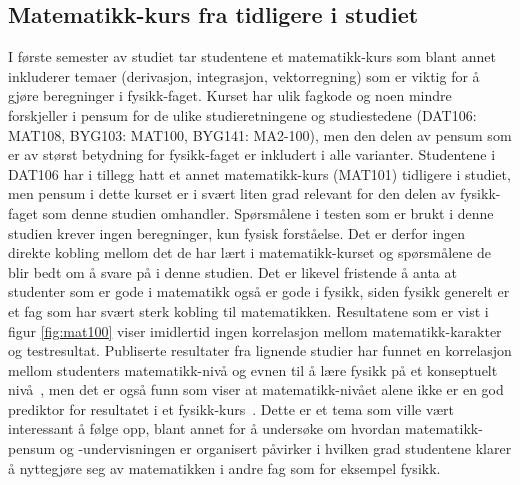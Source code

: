 \documentclass[a4paper,norsk,12pt]{report}
\begin{document}
\subsection{Matematikk-kurs fra tidligere i studiet}
I første semester av studiet tar studentene et matematikk-kurs som blant annet inkluderer temaer (derivasjon, integrasjon, vektorregning) som er viktig for å gjøre beregninger i fysikk-faget. Kurset har ulik fagkode og noen mindre forskjeller i pensum for de ulike studieretningene og studiestedene (DAT106: MAT108, BYG103: MAT100, BYG141: MA2-100), men den delen av pensum som er av størst betydning for fysikk-faget er inkludert i alle varianter. Studentene i DAT106 har i tillegg hatt et annet matematikk-kurs (MAT101) tidligere i studiet, men pensum i dette kurset er i svært liten grad relevant for den delen av fysikk-faget som denne studien omhandler. Spørsmålene i testen som er brukt i denne studien krever ingen beregninger, kun fysisk forståelse. Det er derfor ingen direkte kobling mellom det de har lært i matematikk-kurset og spørsmålene de blir bedt om å svare på i denne studien. Det er likevel fristende å anta at studenter som er gode i matematikk også er gode i fysikk, siden fysikk generelt er et fag som har svært sterk kobling til matematikken. Resultatene som er vist i figur \ref{fig:mat100} viser imidlertid ingen korrelasjon mellom matematikk-karakter og testresultat. Publiserte resultater fra lignende studier har funnet en korrelasjon mellom studenters matematikk-nivå og evnen til å lære fysikk på et konseptuelt nivå~\cite{5c27a2a258c342bc822a508f17d2b0da}, men det er også funn som viser at matematikk-nivået alene ikke er en god prediktor for resultatet i et fysikk-kurs~\cite{VINITSKYPINSKY2014611}. Dette er et tema som ville vært interessant å følge opp, blant annet for å undersøke om hvordan matematikk-pensum og -undervisningen er organisert påvirker i hvilken grad studentene klarer  å nyttegjøre seg av matematikken i andre fag som for eksempel fysikk.
\end{document}
